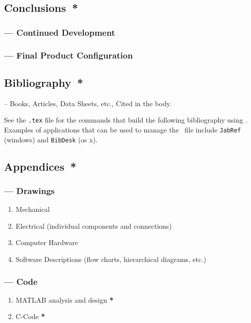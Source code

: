 \documentclass[twocolumn]{article}
\begin{document}
\subsection*{Conclusions{\color{red}\ *}}
\subsubsection*{ --- Continued Development}
\subsubsection*{ --- Final Product Configuration}

\subsection*{Bibliography{\color{red}\ *}}
-- Books, Articles, Data Sheets, etc., Cited in the body. 

See the \verb|.tex| file for the commands that build the following bibliography using \BibTeX. Examples of applications that can be used to manage the \BibTeX\  file include \verb|JabRef| (windows) and \verb|BibDesk| (os x).

\subsection*{Appendices{\color{red}\ *}}
\subsubsection*{ --- Drawings}
\begin{enumerate}
\item{Mechanical}
\item{Electrical (individual components and connections)}
\item{Computer Hardware}
\item{Software Descriptions (flow charts, hierarchical diagrams, etc.)}
\end{enumerate}

\subsubsection*{ --- Code}
\begin{enumerate}
\item{MATLAB analysis and design}   {\color{red}\bf{*}}
\item{C-Code} {\color{red}\bf{*}}
\end{enumerate}
\end{document}
